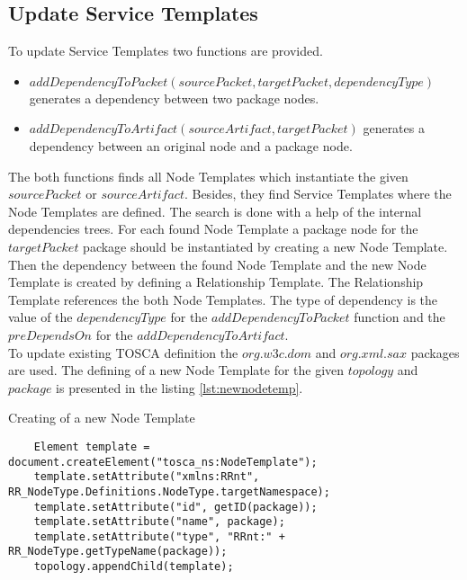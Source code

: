 \subsection*{Update Service Templates}
To update Service Templates two functions are provided.
\begin{itemize}
	\item $addDependencyToPacket(sourcePacket, targetPacket, dependencyType)$ generates a dependency between two package nodes.
	\item $addDependencyToArtifact(sourceArtifact, targetPacket)$ generates a dependency between an original node and a package node.
\end{itemize} 
The both functions finds all Node Templates which instantiate the given $sourcePacket$ or $sourceArtifact$.
Besides, they find Service Templates where the Node Templates are defined.
The search is done with a help of the internal dependencies trees.
For each found Node Template a package node for the $targetPacket$ package should be instantiated by creating a new Node Template.
Then the dependency between the found Node Template and the new Node Template is created by defining a Relationship Template.
The Relationship Template references the both Node Templates. 
The type of dependency is the value of the $dependencyType$ for the $addDependencyToPacket$ function and the $preDependsOn$ for the $addDependencyToArtifact$.\\
To update existing TOSCA definition the $org$.$w3c$.$dom$ and $org$.$xml$.$sax$ packages are used. 
The defining of a new Node Template for the given $topology$ and $package$ is presented in the listing \ref{lst:newnodetemp}.
\begin{Listing}
	\caption{Creating of a new Node Template}
	\label{lst:newnodetemp}
	\begin{lstlisting}  
	Element template = document.createElement("tosca_ns:NodeTemplate");
	template.setAttribute("xmlns:RRnt", RR_NodeType.Definitions.NodeType.targetNamespace);
	template.setAttribute("id", getID(package));
	template.setAttribute("name", package);
	template.setAttribute("type", "RRnt:" + RR_NodeType.getTypeName(package));
	topology.appendChild(template);
	\end{lstlisting}
\end{Listing}
